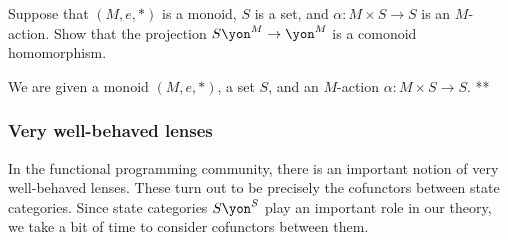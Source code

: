\documentclass[Book-Poly]{subfiles}
\begin{document}
\begin{exercise}
Suppose that $(M,e,*)$ is a monoid, $S$ is a set, and $\alpha\colon M\times S\to S$ is an $M$-action.
Show that the projection $S\yon^M\to\yon^M$ is a comonoid homomorphism.
\begin{solution}
We are given a monoid $(M,e,*)$, a set $S$, and an $M$-action $\alpha\colon M\times S\to S$.
**
\end{solution}
\end{exercise}


\subsubsection{Very well-behaved lenses}

In the functional programming community, there is an important notion of very well-behaved lenses.
These turn out to be precisely the cofunctors between state categories.
Since state categories $S\yon^S$ play an important role in our theory, we take a bit of time to consider cofunctors between them.
\end{document}

